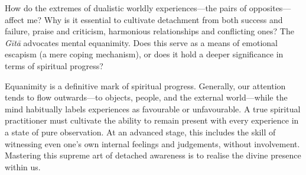 \begin{mananam}{}
\normalfont\mananamtext How do the extremes of dualistic worldly experiences—the pairs of opposites—affect me?
Why is it essential to cultivate detachment from both success and failure, praise and criticism, harmonious relationships and conflicting ones?
The \emph{Gītā} advocates mental equanimity. Does this serve as a means of emotional escapism (a mere coping mechanism), or does it hold a deeper significance in terms of spiritual progress?
\end{mananam}
\sreflect
\begin{inspiration}{}
\normalfont\mananamtext Equanimity is a definitive mark of spiritual progress. Generally, our attention tends to flow outwards—to objects, people, and the external world—while the mind habitually labels experiences as favourable or unfavourable.
A true spiritual practitioner must cultivate the ability to remain present with every experience in a state of pure observation. At an advanced stage, this includes the skill of witnessing even one’s own internal feelings and judgements, without involvement. Mastering this supreme art of detached awareness is to realise the divine presence within us.
\end{inspiration}
\newpage


